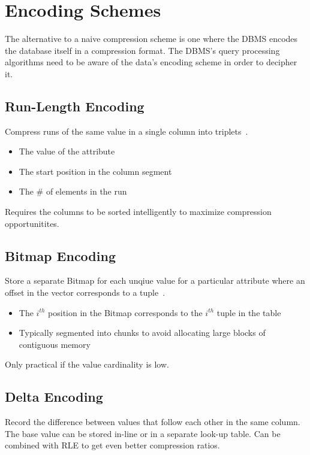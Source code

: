 \documentclass[11pt]{article}
\begin{document}
\section{Encoding Schemes}
The alternative to a naive compression scheme is one where the DBMS encodes the database itself in 
a compression format. The DBMS's query processing algorithms need to be aware of the data's 
encoding scheme in order to decipher it.


\subsection*{Run-Length Encoding}
Compress runs of the same value in a single column into triplets~\cite{p31-roth}.
\begin{itemize}
    \item The value of the attribute
    \item The start position in the column segment
    \item The \# of elements in the run
\end{itemize}
Requires the columns to be sorted intelligently to maximize compression opportunitites.

\subsection*{Bitmap Encoding}
Store a separate Bitmap for each unqiue value for a particular attribute where an offset 
in the vector corresponds to a tuple~\cite{franklin14}.
\begin{itemize}
    \item The $i^{th}$ position in the Bitmap corresponds to the $i^{th}$ tuple in the table
    \item Typically segmented into chunks to avoid allocating large blocks of contiguous memory
\end{itemize}
Only practical if the value cardinality is low.

\subsection*{Delta Encoding}
Record the difference between values that follow each other in the same column.
The base value can be stored in-line or in a separate look-up table.
Can be combined with RLE to get even better compression ratios.
\end{document}
